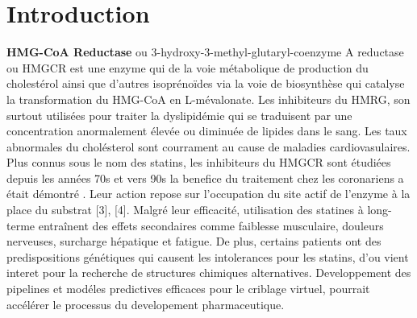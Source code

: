 \documentclass{isddmaster}
\begin{document}
	
	\checkyears
	
	\vspace*{5mm}
	
	
	
	\def\title{Projet de Criblage Virtuel \\[5mm] \normalsize \textit{UE "Chemoinformatics tools for biological therapeutics"}}


	
	\def\spe{Modélisation des macromolécules} 
	\def\author{Anna Perova}
	\def\studentnumber{22519413}
	\def\shorttitle{Rapport Criblage}
	\def\mydate{\today}
	
	\Entete
	\medskip
	\begin{abstract}
		{\small \textbf{Résumé:} 
		
		\textbf{Mots clés:} }
	\end{abstract}
	
	\vfill
	
	\newpage
	
	\setcounter{page}{1}
	\section{Introduction}
	\textbf{HMG-CoA Reductase} ou 3-hydroxy-3-methyl-glutaryl-coenzyme A reductase ou HMGCR est une enzyme qui de la voie métabolique de production du cholestérol ainsi que d'autres isoprénoïdes via la voie de biosynthèse qui catalyse la transformation du HMG-CoA en L-mévalonate.
	Les inhibiteurs du HMRG, son surtout utilisées pour traiter la dyslipidémie qui se traduisent par une concentration anormalement élevée ou diminuée de lipides dans le sang. Les taux abnormales du cholésterol sont courrament au cause de maladies cardiovasulaires. 
	Plus connus sous le nom des statins, les inhibiteurs du HMGCR sont étudiées depuis les années 70s \cite{endoML236AML236BML236C1976b,endoCompetitiveInhibition3hydroxy3methylglutaryl1976} et vers 90s la benefice du traitement chez les coronariens a était démontré \cite{RandomisedTrialCholesterol}.
	Leur action repose sur l'occupation du site actif de l'enzyme à la place du substrat [3], [4]. Malgré leur efficacité, utilisation des statines à long-terme entraînent des effets secondaires comme faiblesse musculaire, douleurs nerveuses, surcharge hépatique et fatigue. De plus, certains patients ont des predispositions génétiques qui causent les intolerances pour les statins, d'ou vient interet pour la recherche de structures chimiques alternatives.
	Developpement des pipelines et modéles predictives efficaces pour le criblage virtuel, pourrait accélérer le processus du developement pharmaceutique.
\end{document}
